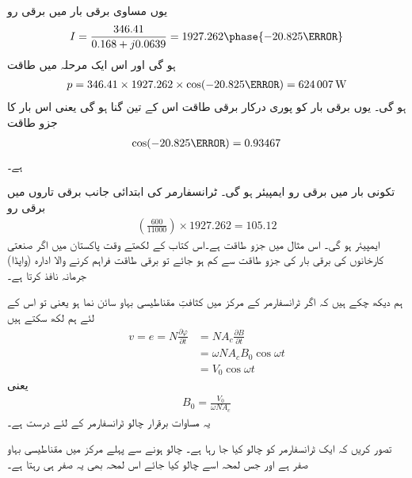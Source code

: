 یوں مساوی برقی بار میں برقی رو
\begin{align*}
I=\frac{346.41}{0.168+j0.0639}=1927.262\phase{-20.825\degree}
\end{align*}
ہو گی اور اس ایک مرحلہ میں طاقت
\begin{align*}
p=346.41 \times 1927.262 \times \cos (-20.825\degree)=\SI{624007}{\watt}
\end{align*}
ہو گی۔ یوں برقی بار کو پوری درکار برقی طاقت اس کے تین گنا ہو گی یعنی   اس بار کا جزو طاقت 
\begin{align*}
\cos (-20.825\degree)=0.93467
\end{align*}
ہے۔

	تکونی بار   میں برقی رو  ایمپیئر ہو گی۔ ٹرانسفارمر کی ابتدائی جانب برقی تاروں میں برقی رو
\begin{align*}
\left(\frac{600}{11000} \right) \times 1927.262=105.12
\end{align*}
  ایمپیئر ہو گی۔
%
اس مثال میں جزو طاقت  ہے۔اس کتاب کے لکھتے وقت پاکستان میں اگر صنعتی کارخانوں کی برقی بار کی جزو طاقت  سے کم ہو جائے تو برقی طاقت فراہم کرنے والا ادارہ (واپڈا) جرمانہ نافذ کرتا ہے۔ 

ہم دیکھ چکے ہیں کہ اگر ٹرانسفارمر کے مرکز میں کثافتِ مقناطیسی بہاو سائن نما ہو یعنی   تو اس کے لئے ہم لکھ سکتے ہیں
\begin{align*}
v=e=N \frac{\partial \varphi}{\partial t}&=N A_c \frac{\partial B}{\partial t}\\
&=\omega N A_c B_0 \cos \omega t\\
&=V_0 \cos \omega t
\end{align*}
یعنی
\begin{align}\label{مساوات_ٹرانسفارمر_درکار_کثافت_بہاو}
B_0=\frac{V_0}{\omega N A_c}
\end{align}
یہ مساوات برقرار چالو ٹرانسفارمر کے لئے درست ہے۔

تصور کریں کہ ایک ٹرانسفارمر کو چالو کیا جا رہا ہے۔ چالو ہونے سے پہلے مرکز میں مقناطیسی بہاو صفر ہے اور جس لمحہ اسے چالو کیا جائے اس لمحہ بھی یہ صفر ہی رہتا ہے۔	

